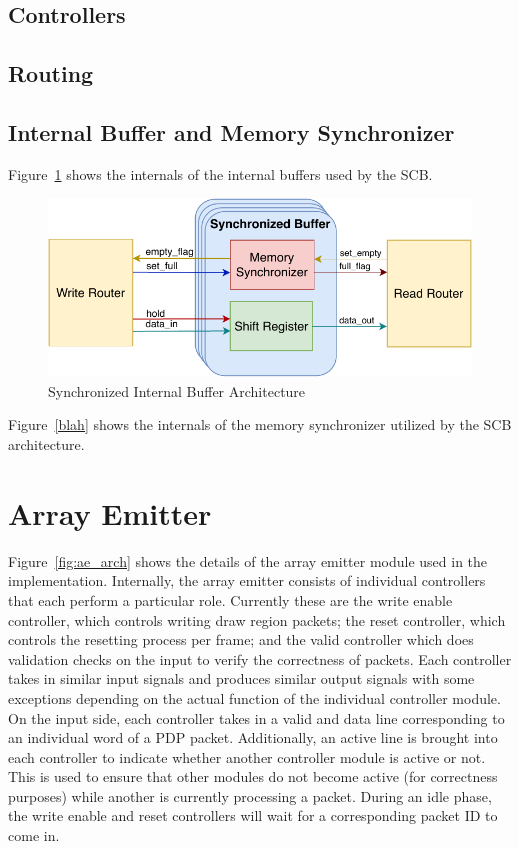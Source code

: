    \subsection{Controllers}

    \subsection{Routing}

    \subsection{Internal Buffer and Memory Synchronizer}
    \label{Sec:MemorySync}

    Figure~\ref{fig:sb_arch} shows the internals of the internal buffers used by the SCB.
    \begin{figure}
        \centering
        \includegraphics[width=1.0\textwidth]{fig/pdp_sb_arch.pdf}
        \caption{Synchronized Internal Buffer Architecture}
        \label{fig:sb_arch}
    \end{figure}

    Figure~\ref{blah} shows the internals of the memory synchronizer utilized by the SCB architecture.

\section{Array Emitter}

    Figure~\ref{fig:ae_arch} shows the details of the array emitter module used in the implementation. Internally, the array emitter consists of individual controllers that each perform a particular role. Currently these are the write enable controller, which controls writing draw region packets; the reset controller, which controls the resetting process per frame; and the valid controller which does validation checks on the input to verify the correctness of packets. Each controller takes in similar input signals and produces similar output signals with some exceptions depending on the actual function of the individual controller module. On the input side, each controller takes in a valid and data line corresponding to an individual word of a PDP packet. Additionally, an active line is brought into each controller to indicate whether another controller module is active or not. This is used to ensure that other modules do not become active (for correctness purposes) while another is currently processing a packet. During an idle phase, the write enable and reset controllers will wait for a corresponding packet ID to come in.

